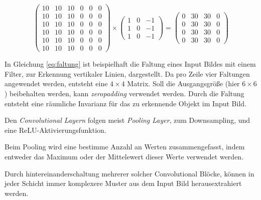 \vspace{1cm}
\begin{equation}
    \label{eq:faltung}
    \begin{pmatrix}
        10 & 10 & 10 & 0 & 0 & 0\\
        10 & 10 & 10 & 0 & 0 & 0\\
        10 & 10 & 10 & 0 & 0 & 0\\
        10 & 10 & 10 & 0 & 0 & 0\\
        10 & 10 & 10 & 0 & 0 & 0\\
        10 & 10 & 10 & 0 & 0 & 0
    \end{pmatrix}
    \times
    \begin{pmatrix}
        1 & 0 & -1\\
        1 & 0 & -1\\
        1 & 0 & -1
    \end{pmatrix}
    = 
    \begin{pmatrix}
        0 & 30 & 30 & 0\\
        0 & 30 & 30 & 0\\
        0 & 30 & 30 & 0\\
        0 & 30 & 30 & 0
    \end{pmatrix}
\end{equation}
\vspace{0.5cm}
\begin{figure}[H]
    \centering
    \def\svgwidth{0.6\textwidth}
    
    \caption{}
    \label{fig:faltung3}
\end{figure}

In Gleichung \ref{eq:faltung} ist beispielhaft die Faltung 
eines Input Bildes mit einem Filter, zur Erkennung 
vertikaler Linien, dargestellt. Da pro Zeile 
vier Faltungen angewendet werden, entsteht 
eine $4\times4$ Matrix. Soll die Ausgangsgröße 
(hier $6\times6$) beibehalten werden, kann
\textit{\Gls{zeropadding}} verwendet werden.
Durch die Faltung entsteht eine räumliche 
Invarianz für das zu erkennende Objekt im 
Input Bild.

Den \textit{Convolutional Layern} folgen meist \textit{Pooling Layer}, 
zum Downsampling, und eine ReLU-Aktivierungsfunktion.

Beim Pooling wird eine bestimme Anzahl an Werten 
zusammengefasst, indem entweder das Maximum oder der 
Mittelewert dieser Werte verwendet werden.

Durch hintereinanderschaltung mehrerer solcher Convolutional Blöcke,
können in jeder Schicht immer komplexere Muster aus dem 
Input Bild herausextrahiert werden.

